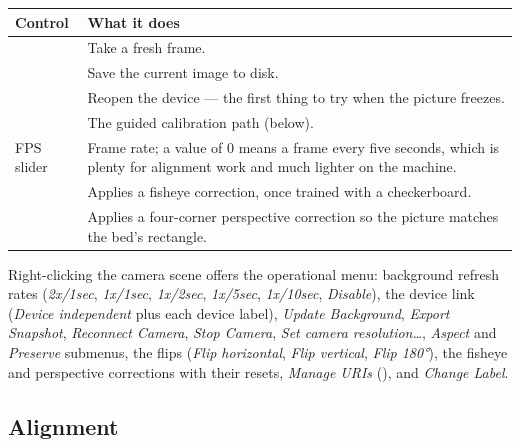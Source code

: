\begin{center}\small
\begin{tabular}{@{}L{5.8cm}L{8.4cm}@{}}
\toprule
\textbf{Control} & \textbf{What it does} \\
\midrule
{} & Take a fresh frame. \\
 & Save the current image to disk. \\
 & Reopen the device --- the first thing to try when the
picture freezes. \\
 & The guided calibration path (below). \\
FPS slider & Frame rate; a value of 0 means a frame every five seconds, which is
plenty for alignment work and much lighter on the machine. \\
 & Applies a fisheye correction, once trained with a
checkerboard. \\
 & Applies a four-corner perspective correction so the
picture matches the bed's rectangle. \\
\bottomrule
\end{tabular}
\end{center}

\noindent Right-clicking the camera scene offers the operational menu: background
refresh rates (\emph{2x/1sec}, \emph{1x/1sec}, \emph{1x/2sec}, \emph{1x/5sec},
\emph{1x/10sec}, \emph{Disable}), the device link (\emph{Device independent} plus
each device label), \emph{Update Background}, \emph{Export Snapshot},
\emph{Reconnect Camera}, \emph{Stop Camera}, \emph{Set camera resolution\dots},
\emph{Aspect} and \emph{Preserve} submenus, the flips (\emph{Flip horizontal},
\emph{Flip vertical}, \emph{Flip 180°}), the fisheye and perspective corrections
with their resets, \emph{Manage URIs} (), and
\emph{Change Label}.

\subsection*{Alignment}

